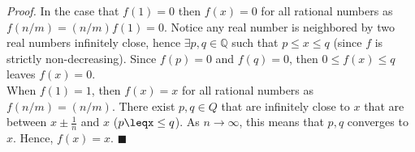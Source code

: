 \documentclass[14pt]{extarticle}
\begin{document}
\begin{enumerate}[label=(\alph*)]
        \textit{Proof.} In the case that $f(1) = 0$ then $f(x) = 0$ for all rational numbers as $f(n/m) = (n/m)f(1) = 0$. Notice any
        real number is neighbored by two real numbers infinitely close, hence $\exists p, q\in \mathbb{Q}$ such that $p\leq x\leq q$ 
        (since $f$ is strictly non-decreasing). Since $f(p) = 0$ and $f(q) = 0$, then $0\leq f(x)\leq q$ leaves $f(x) = 0$.\\

        When $f(1) = 1$, then $f(x) = x$ for all rational numbers as $f(n/m) = (n/m)$. There exist $p, q\in Q$
        that are infinitely close to $x$ that are between $x \pm \frac{1}{n}$ and $x$ ($p\leqx\leq q$). 
        As $n\to \infty$, this means that $p, q$ converges to $x$. Hence, $f(x) = x$.
        \hfill
        $\blacksquare$

\end{enumerate}
\end{document}
